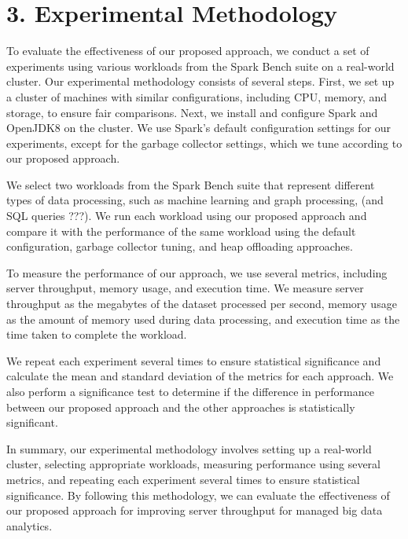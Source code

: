 \documentclass[twocolumn,10pt]{asme2e}
\begin{document}
\section*{3. Experimental Methodology}

To evaluate the effectiveness of our proposed approach, we conduct a set of experiments using various workloads from the Spark Bench suite on a real-world cluster. Our experimental methodology consists of several steps. First, we set up a cluster of machines with similar configurations, including CPU, memory, and storage, to ensure fair comparisons. Next, we install and configure Spark and OpenJDK8 on the cluster. We use Spark's default configuration settings for our experiments, except for the garbage collector settings, which we tune according to our proposed approach.

We select two workloads from the Spark Bench suite that represent different types of data processing, such as machine learning and graph processing, (and SQL queries ???). We run each workload using our proposed approach and compare it with the performance of the same workload using the default configuration, garbage collector tuning, and heap offloading approaches.

To measure the performance of our approach, we use several metrics, including server throughput, memory usage, and execution time. We measure server throughput as the megabytes of the dataset processed per second, memory usage as the amount of memory used during data processing, and execution time as the time taken to complete the workload.

We repeat each experiment several times to ensure statistical significance and calculate the mean and standard deviation of the metrics for each approach. We also perform a significance test to determine if the difference in performance between our proposed approach and the other approaches is statistically significant.

In summary, our experimental methodology involves setting up a real-world cluster, selecting appropriate workloads, measuring performance using several metrics, and repeating each experiment several times to ensure statistical significance. By following this methodology, we can evaluate the effectiveness of our proposed approach for improving server throughput for managed big data analytics.
\end{document}
